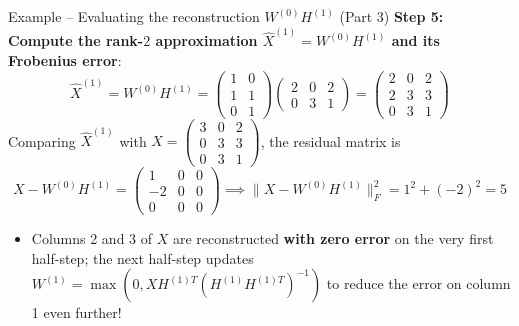 \documentclass[aspectratio=169]{beamer}\usepackage[]{graphicx}\usepackage[]{xcolor}
\begin{document}
\begin{frame}{Example -- Evaluating the reconstruction $W^{(0)} H^{(1)}$ (Part 3)}
\textbf{Step 5: Compute the rank-$2$ approximation $\hat{X}^{(1)} = W^{(0)} H^{(1)}$ and its Frobenius error}:
\[
\hat{X}^{(1)} = W^{(0)} H^{(1)} =
\begin{pmatrix} 1 & 0 \\ 1 & 1 \\ 0 & 1 \end{pmatrix}
\begin{pmatrix} 2 & 0 & 2 \\ 0 & 3 & 1 \end{pmatrix}
= \begin{pmatrix} 2 & 0 & 2 \\ 2 & 3 & 3 \\ 0 & 3 & 1 \end{pmatrix}
\]
\vfill
Comparing $\hat{X}^{(1)}$ with $X = \begin{pmatrix} 3 & 0 & 2 \\ 0 & 3 & 3 \\ 0 & 3 & 1 \end{pmatrix}$, the residual matrix is
\[
X - W^{(0)} H^{(1)} = \begin{pmatrix} 1 & 0 & 0 \\ -2 & 0 & 0 \\ 0 & 0 & 0 \end{pmatrix}
\implies
\|X - W^{(0)} H^{(1)}\|_F^2 = 1^2 + (-2)^2 = 5
\]
\vfill
\begin{itemize}
\item Columns 2 and 3 of $X$ are reconstructed \textbf{with zero error} on the very first half-step; the next half-step updates $W^{(1)} = \max\!\left(0, X H^{(1)T}(H^{(1)}H^{(1)T})^{-1}\right)$ to reduce the error on column 1 even further!
\end{itemize}
\end{frame}
\end{document}
